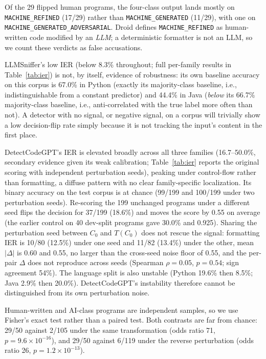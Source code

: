 \documentclass[sigconf,review,anonymous]{acmart}
\begin{document}
Of the 29 flipped human programs, the four-class output lands mostly on \texttt{MACHINE\_REFINED} (17/29) rather than \texttt{MACHINE\_GENERATED} (11/29), with one on \texttt{MACHINE\_GENERATED\_\allowbreak ADVERSARIAL}. Droid defines \texttt{MACHINE\_REFINED} as human-written code modified by an \emph{LLM}; a deterministic formatter is not an LLM, so we count these verdicts as false accusations.

LLMSniffer's low IER (below 8.3\% throughout; full per-family results in Table~\ref{tab:ier}) is not, by itself, evidence of robustness: its own baseline accuracy on this corpus is 67.0\% in Python (exactly its majority-class baseline, i.e., indistinguishable from a constant predictor) and 44.4\% in Java (\emph{below} its 66.7\% majority-class baseline, i.e., anti-correlated with the true label more often than not). A detector with no signal, or negative signal, on a corpus will trivially show a low decision-flip rate simply because it is not tracking the input's content in the first place.

DetectCodeGPT's IER is elevated broadly across all three families (16.7--50.0\%, secondary evidence given its weak calibration; Table~\ref{tab:ier} reports the original scoring with independent perturbation seeds), peaking under control-flow rather than formatting, a diffuse pattern with no clear family-specific localization. Its binary accuracy on the test corpus is at chance (99/199 and 100/199 under two perturbation seeds). Re-scoring the 199 unchanged programs under a different seed flips the decision for 37/199 (18.6\%) and moves the score by 0.55 on average (the earlier control on 40 dev-split programs gave 30.0\% and 0.925). Sharing the perturbation seed between $C_0$ and $T(C_0)$ does not rescue the signal: formatting IER is 10/80 (12.5\%) under one seed and 11/82 (13.4\%) under the other, mean $|\Delta|$ is 0.60 and 0.55, no larger than the cross-seed noise floor of 0.55, and the per-pair $\Delta$ does not reproduce across seeds (Spearman $\rho{=}0.05$, $p{=}0.54$; sign agreement 54\%). The language split is also unstable (Python 19.6\% then 8.5\%; Java 2.9\% then 20.0\%). DetectCodeGPT's instability therefore cannot be distinguished from its own perturbation noise.

Human-written and AI-class programs are independent samples, so we use Fisher's exact test rather than a paired test. Both contrasts are far from chance: 29/50 against 2/105 under the same transformation (odds ratio 71, $p{=}9.6{\times}10^{-16}$), and 29/50 against 6/119 under the reverse perturbation (odds ratio 26, $p{=}1.2{\times}10^{-13}$).
\end{document}
